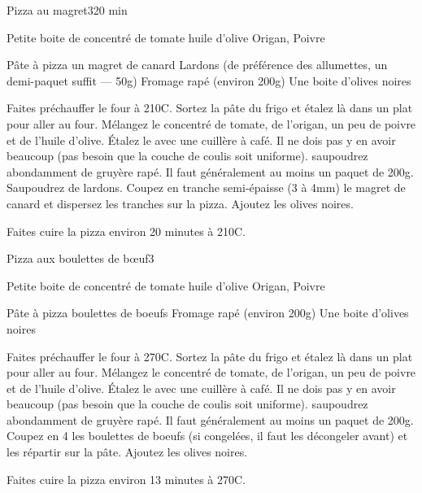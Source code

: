 \begin{recette}{Pizza au magret}{3}{}{20 min}

\begin{ingredients}
\ingredient Petite boite de concentré de tomate
\ingredient huile d'olive
\ingredient Origan, Poivre

\ingredient Pâte à pizza
\ingredient un magret de canard
\ingredient Lardons (de préférence des allumettes, un demi-paquet suffit --- 50g)
\ingredient Fromage rapé (environ 200g)
\ingredient Une boite d'olives noires
\end{ingredients}

\begin{preparation}
\etape Faites préchauffer le four à 210\degres C.
\etape Sortez la pâte du frigo et étalez là dans un plat pour aller au four.
\etape Mélangez le concentré de tomate, de l'origan, un peu de poivre et de l'huile d'olive.
\etape Étalez le avec une cuillère à café. Il ne dois pas y en avoir beaucoup (pas besoin que la couche de coulis soit uniforme).
\etape saupoudrez abondamment de gruyère rapé. Il faut généralement au moins un paquet de 200g. Saupoudrez de lardons.
\etape Coupez en tranche semi-épaisse (3 à 4mm) le magret de canard et dispersez les tranches sur la pizza.
\etape Ajoutez les olives noires.
\end{preparation}

\begin{cuisson}
Faites cuire la pizza environ 20 minutes à 210\degres C.
\end{cuisson}
\end{recette}

\begin{recette}{Pizza aux boulettes de bœuf}{3}{}{}

\begin{ingredients}
\ingredient Petite boite de concentré de tomate
\ingredient huile d'olive
\ingredient Origan, Poivre

\ingredient Pâte à pizza
 boulettes de boeufs
\ingredient Fromage rapé (environ 200g)
\ingredient Une boite d'olives noires
\end{ingredients}

\begin{preparation}
\etape Faites préchauffer le four à 270\degres C.
\etape Sortez la pâte du frigo et étalez là dans un plat pour aller au four.
\etape Mélangez le concentré de tomate, de l'origan, un peu de poivre et de l'huile d'olive.
\etape Étalez le avec une cuillère à café. Il ne dois pas y en avoir beaucoup (pas besoin que la couche de coulis soit uniforme).
\etape saupoudrez abondamment de gruyère rapé. Il faut généralement au moins un paquet de 200g.
\etape Coupez en 4 les boulettes de boeufs (si congelées, il faut les décongeler avant) et les répartir sur la pâte.
\etape Ajoutez les olives noires.
\end{preparation}

\begin{cuisson}
Faites cuire la pizza environ 13 minutes à 270\degres C.
\end{cuisson}
\end{recette}


